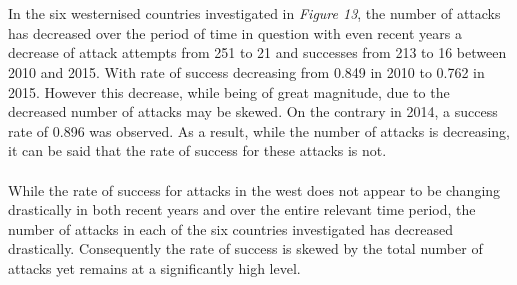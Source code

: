 \documentclass[10pt,a4paper]{article}
\begin{document}
\\\\
In the six westernised countries investigated in \textit{Figure 13}, the number of attacks has decreased over the period of time in question with even recent years a decrease of attack attempts from 251 to 21 and successes from 213 to 16 between 2010 and 2015. With rate of success decreasing from 0.849 in 2010 to 0.762 in 2015. However this decrease, while being of great magnitude, due to the decreased number of attacks may be skewed. On the contrary in 2014, a success rate of 0.896 was observed. As a result, while the number of attacks is decreasing, it can be said that the rate of success for these attacks is not.
\\\\
While the rate of success for attacks in the west does not appear to be changing drastically in both recent years and over the entire relevant time period, the number of attacks in each of the six countries investigated has decreased drastically. Consequently the rate of success is skewed by the total number of attacks yet remains at a significantly high level.
\end{document}
